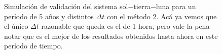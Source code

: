 \begin{figure}
{	\label{fig:ej1_m2_1825_12}
	}
	\caption{
		Simulación de validación del sistema sol$-$tierra$-$luna para un período de 5 años y distintos $\Delta t$
		con el método 2.
		Acá ya vemos que el único $\Delta t$ razonable que queda es el de 1 hora,
		pero vale la pena notar que es el mejor de los resultados obtenidos hasta ahora en este período de tiempo.
	}
	\label{ fig:res_ej1_m2_1825 }
\end{figure}
